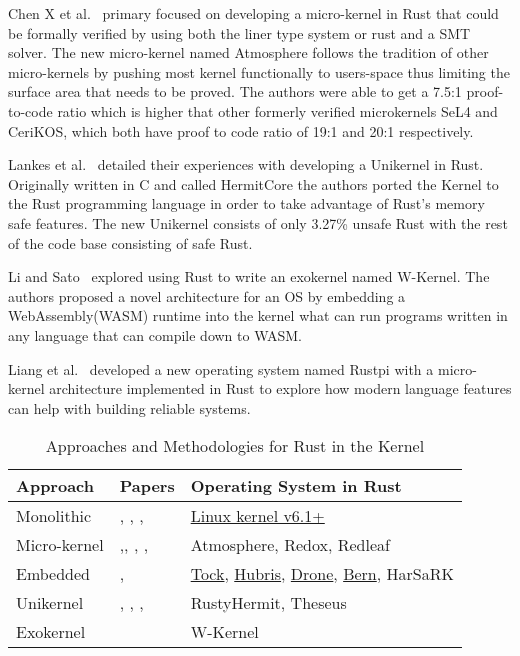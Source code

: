 \documentclass[sigconf]{acmart}
\begin{document}
Chen X et al.~\cite{Chen2023-wb} primary focused on developing a micro-kernel in Rust that could be formally verified by using both the liner type system or rust and a SMT solver. The new micro-kernel named Atmosphere follows the tradition of other micro-kernels by pushing most kernel functionally to users-space thus limiting the surface area that needs to be proved. The authors were able to get a 7.5:1 proof-to-code ratio which is higher that other formerly verified microkernels SeL4 and CeriKOS, which both have proof to code ratio of 19:1 and 20:1 respectively.

Lankes et al.~\cite{Lankes2019-cm} detailed their experiences with developing a Unikernel in Rust. Originally written in C and called HermitCore the authors ported the Kernel to the Rust programming language in order to take advantage of Rust's memory safe features. The new Unikernel consists of only 3.27\% unsafe Rust with the rest of the code base consisting of safe Rust.

Li and Sato~\cite{Li2024-yb} explored using Rust to write an exokernel named W-Kernel. The authors proposed a novel architecture for an OS by embedding a WebAssembly(WASM) runtime into the kernel what can run programs written in any language that can compile down to WASM.

Liang et al.~\cite{Liang2021-bo} developed a new operating system named Rustpi with a micro-kernel architecture implemented in Rust to explore how modern language features can help with building reliable systems.

\begin{table}
    \begin{tabular}{||l|l|l||}
    \hline
    Approach & Papers & Operating System in Rust\\
    \hline\hline
    Monolithic  & \cite{The_kernel_development_community_undated-iw}, \cite{Li2019-ru}, \cite{Miller2021-pg}, \cite{Oikawa2023-ms} & \href{https://docs.kernel.org/rust/}{Linux kernel v6.1+}\\
    Micro-kernel & \cite{Chen2023-wb},\cite{Liang2021-bo}, \cite{Liu2024-xe}, \cite{Narayanan2020-gs}, \cite{Narayanan2019-fd} & Atmosphere, Redox, Redleaf\\
    Embedded & \cite{Culic2022-bk}, \cite{Vishnunaryan2022-yd} & \href{https://github.com/tock/tock}{Tock}, \href{https://hubris.oxide.computer/}{Hubris}, \href{https://www.drone-os.com/}{Drone}, \href{https://bern-rtos.org/}{Bern}, HarSaRK \\
    Unikernel & \cite{Lankes2019-cm},  \cite{Boos2020-zh}, \cite{Ijaz2023-da}, \cite{Sung2020-bb}  & RustyHermit, Theseus \\
    Exokernel & \cite{Li2024-yb} & W-Kernel \\
    \hline
  \end{tabular}
  \caption{Approaches and Methodologies for Rust in the Kernel}
    \label{tab:RQ1}
\end{table}
\end{document}
